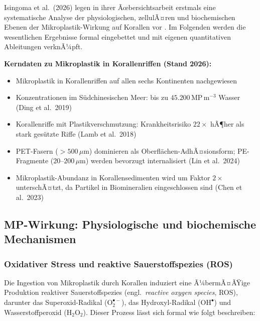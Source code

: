﻿\documentclass[12pt,a4paper]{article}
\theoremstyle{definition}
\theoremstyle{remark}
\newcommand{\MP}{Mikroplastik}
\begin{document}
Isingoma et al.\ (2026) legen in ihrer Ãœbersichtsarbeit erstmals eine systematische
Analyse der physiologischen, zellulÃ¤ren und biochemischen Ebenen der
\MP{}-Wirkung auf Korallen vor \cite{isingoma2026microplastics}. Im Folgenden
werden die wesentlichen Ergebnisse formal eingebettet und mit eigenen
quantitativen Ableitungen verknÃ¼pft.

\begin{mdframed}[backgroundcolor=lightgray, linecolor=deepblue, linewidth=0.8pt]
\textbf{Kerndaten zu Mikroplastik in Korallenriffen (Stand 2026):}
\begin{itemize}[noitemsep]
  \item Mikroplastik in Korallenriffen auf allen sechs Kontinenten nachgewiesen
        \cite{isingoma2026microplastics}
  \item Konzentrationen im S\"udchinesischen Meer: bis zu
        $45{.}200$\,MP\,m$^{-3}$ Wasser (Ding et al.\ 2019)
  \item Korallenriffe mit Plastikverschmutzung: Krankheitsrisiko $22\times$ hÃ¶her als
        stark ges\"utzte Riffe (Lamb et al.\ 2018)
  \item PET-Fasern (${>}500\,\mu$m) dominieren als Oberfl\"achen-AdhÃ¤sionsform;
        PE-Fragmente ($20$--$200\,\mu$m) werden bevorzugt internalisiert
        (Lin et al.\ 2024)
  \item Mikroplastik-Abundanz in Korallensedimenten wird um Faktor $2\times$ 
        unterschÃ¤tzt, da Partikel in Biomineralien eingeschlossen sind
        (Chen et al.\ 2023)
\end{itemize}
\end{mdframed}

\subsection{MP-Wirkung: Physiologische und biochemische Mechanismen}
\label{subsec:mechanismen}

\subsubsection{Oxidativer Stress und reaktive Sauerstoffspezies (ROS)}

Die Ingestion von \MP{} durch Korallen induziert eine Ã¼bermÃ¤ÃŸige Produktion
reaktiver Sauerstoffspezies (engl.\ \textit{reactive oxygen species}, ROS),
darunter das Superoxid-Radikal ($\text{O}_2^{\bullet-}$), das Hydroxyl-Radikal
($\text{OH}^\bullet$) und Wasserstoffperoxid ($\text{H}_2\text{O}_2$).
Dieser Prozess l\"asst sich formal wie folgt beschreiben:
\end{document}
